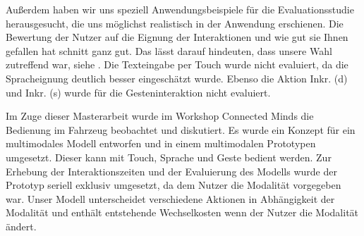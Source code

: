 Außerdem haben wir uns speziell Anwendungsbeispiele für die Evaluationsstudie herausgesucht, die uns möglichst realistisch in der Anwendung erschienen. 
Die Bewertung der Nutzer auf die Eignung der Interaktionen und wie gut sie Ihnen gefallen hat schnitt ganz gut. 
Das lässt darauf hindeuten, dass unsere Wahl zutreffend war, siehe .
Die Texteingabe per Touch wurde nicht evaluiert, da die Spracheignung deutlich besser eingeschätzt wurde. 
Ebenso die Aktion Inkr. (d) und Inkr. (s) wurde für die Gesteninteraktion nicht evaluiert. 

Im Zuge dieser Masterarbeit wurde im Workshop Connected Minds die Bedienung im Fahrzeug beobachtet und diskutiert. Es wurde ein Konzept für ein multimodales Modell entworfen und in einem multimodalen Prototypen umgesetzt. Dieser kann mit Touch, Sprache und Geste bedient werden. Zur Erhebung der Interaktionszeiten und der Evaluierung des Modells wurde der Prototyp seriell exklusiv umgesetzt, da dem Nutzer die Modalität vorgegeben war. Unser Modell unterscheidet verschiedene Aktionen in Abhängigkeit der Modalität und enthält entstehende Wechselkosten wenn der Nutzer die Modalität ändert. 